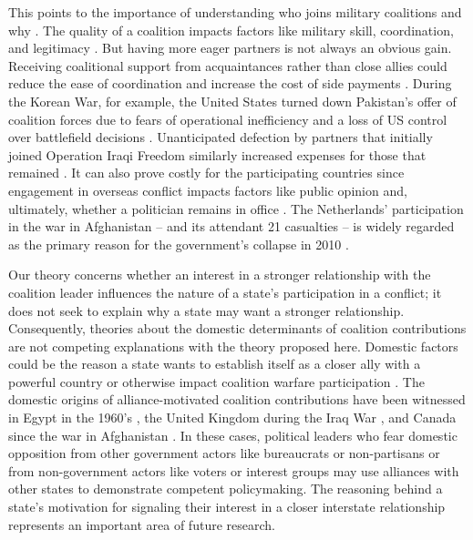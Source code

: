 \documentclass[12pt,letterpaper]{article}
\begin{document}
	This points to the importance of understanding who joins military coalitions and why \citep{wolford_politicsmilitarycoalitions_2015, moller_fightingfriendsinstitutional_2016}. The quality of a coalition impacts factors like military skill, coordination, and legitimacy \citep{kreps_coalitionsconvenienceunited_2011, auerswald_natoafghanistanfighting_2014, saideman_ambivalentcoalitiondoing_2016, cranmer_coalitionqualitymultinational_2017, cappellazielinski_organizingperformancecoalition_2020}. But having more eager partners is not always an obvious gain. Receiving coalitional support from acquaintances rather than close allies could reduce the ease of coordination and increase the cost of side payments \citep{morrow_alliancesasymmetryalternative_1991, papayoanou_intraalliancebargainingbosnia_1997, wolford_politicsmilitarycoalitions_2015, henke_buyingalliespayment_2019}. During the Korean War, for example, the United States turned down Pakistan's offer of coalition forces due to fears of operational inefficiency and a loss of US control over battlefield decisions \citep{stueck_koreanwarinternational_1997}. Unanticipated defection by partners that initially joined Operation Iraqi Freedom similarly increased expenses for those that remained \citep[12-13]{mcinnis_varietiesdefectionstrategies_2018}. It can also prove costly for the participating countries since engagement in overseas conflict impacts factors like public opinion and, ultimately, whether a politician remains in office \citep{chiozza_leadersinternationalconflict_2011, wolford_nationalleaderspolitical_2016, mello_pathscoalitiondefection_2020}. The Netherlands' participation in the war in Afghanistan -- and its attendant 21 casualties -- is widely regarded as the primary reason for the government's collapse in 2010 \citep[152-156]{auerswald_natoafghanistanfighting_2014}.

	Our theory concerns whether an interest in a stronger relationship with the coalition leader influences the nature of a state's participation in a conflict; it does not seek to explain why a state may want a stronger relationship. Consequently, theories about the domestic determinants of coalition contributions are not competing explanations with the theory proposed here. Domestic factors could be the reason a state wants to establish itself as a closer ally with a powerful country \citep{tago_whenaredemocratic_2009, pilster_aredemocraciesbetter_2011, wolford_nationalleaderspolitical_2016} or otherwise impact coalition warfare participation \citep{baum_iraqcoalitionwilling_2013}. The domestic origins of alliance-motivated coalition contributions have been witnessed in Egypt in the 1960's \citep{barnett_domesticsourcesalliances_1991}, the United Kingdom during the Iraq War \citep{davidson_americaallieswar_2011}, and Canada since the war in Afghanistan \citep{massie_alliancevaluestatus_2018, mckay_whycanadabest_2018}. In these cases, political leaders who fear domestic opposition from other government actors like bureaucrats or non-partisans or from non-government actors like voters or interest groups may use alliances with other states to demonstrate competent policymaking. The reasoning behind a state's motivation for signaling their interest in a closer interstate relationship represents an important area of future research.
\end{document}
